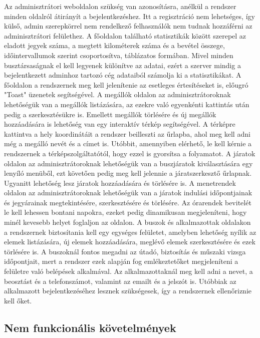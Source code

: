 Az adminisztrátori weboldalon szükség van azonosításra, anélkül a rendszer minden oldalról átirányít a bejelentkezéshez. Itt a regisztráció nem lehetséges, így külső, admin szerepkörrel nem rendelkező felhasználók nem tudnak hozzáférni az adminisztrátori felülethez. A főoldalon található statisztikák között szerepel az eladott jegyek száma, a megtett kilométerek száma és a bevétel összege, időintervallumok szerint csoportosítva, táblázatos formában. Mivel minden busztársaságnak el kell legyenek különítve az adatai, ezért a szerver mindig a bejelentkezett adminhoz tartozó cég adataiból számolja ki a statisztikákat. A főoldalon a rendszernek meg kell jelenítenie az esetleges értesítéseket is, előugró "Toast" üzenetek segítségével. A megállók oldalon az adminisztrátoroknak lehetőségük van a megállók listázására, az ezekre való egyenkénti kattintás után pedig a szerkesztésükre is. Emellett megállók törlésére és új megállók hozzáadására is lehetőség van egy interaktív térkép segítségével. A térképre kattintva a hely koordinátáit a rendszer beilleszti az űrlapba, ahol meg kell adni még a megálló nevét és a címet is. Utóbbit, amennyiben elérhető, le kell kérnie a rendszernek a térképszolgáltatótól, hogy ezzel is gyorsítsa a folyamatot. A járatok oldalon az adminisztrátoroknak lehetőségük van a buszjáratok kiválasztására egy lenyíló menüből, ezt követően pedig meg kell jelennie a járatszerkesztő űrlapnak. Ugyanitt lehetőség lesz járatok hozzáadására és törlésére is. A menetrendek oldalon az adminisztrátoroknak lehetőségük van a járatok indulási időpontjainak és jegyárainak megtekintésére, szerkesztésére és törlésére. Az órarendek bevitelét le kell lehessen bontani napokra, ezeket pedig dinamikusan megjeleníteni, hogy minél kevesebb helyet foglaljon az oldalon. A buszok és alkalmazottak oldalakon a rendszernek biztosítania kell egy egységes felületet, amelyben lehetőség nyílik az elemek listázására, új elemek hozzáadására, meglévő elemek szerkesztésére és ezek törlésére is. A buszoknál fontos megadni az útadó, biztosítás és műszaki vizsga időpontjait, mert a rendszer ezek alapján fog emlékeztetőket megjeleníteni a felületre való belépések alkalmával. Az alkalmazottaknál meg kell adni a nevet, a beosztást és a telefonszámot, valamint az emailt és a jelszót is. Utóbbiak az alkalmazott bejelentkezéséhez lesznek szükségesek, így a rendszernek ellenőriznie kell őket.

\subsection{Nem funkcionális követelmények}
